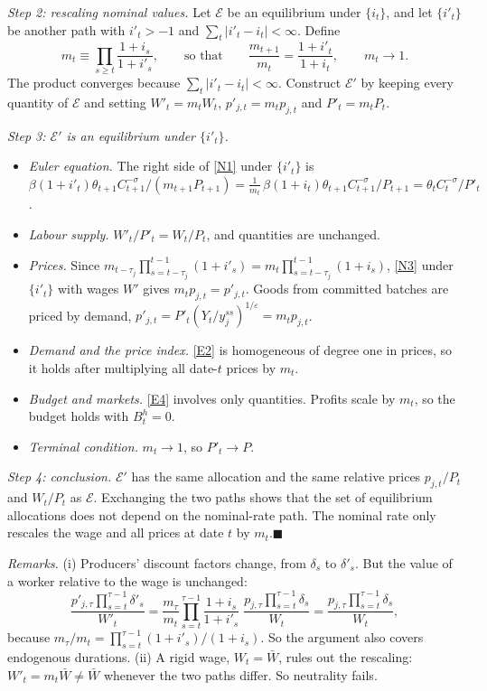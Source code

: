 \documentclass[11pt]{article}
\theoremstyle{definition}
\begin{document}
\emph{Step 2: rescaling nominal values.} Let $\mathcal E$ be an equilibrium under $\{i_t\}$, and let
$\{i'_t\}$ be another path with $i'_t>-1$ and $\sum_t|i'_t-i_t|<\infty$. Define
\[
  m_t\equiv\prod_{s\ge t}\frac{1+i_s}{1+i'_s},\qquad\text{so that}\qquad
  \frac{m_{t+1}}{m_t}=\frac{1+i'_t}{1+i_t},\qquad m_t\to1 .
\]
The product converges because $\sum_t|i'_t-i_t|<\infty$. Construct $\mathcal E'$ by keeping every
quantity of $\mathcal E$ and setting $W'_t=m_tW_t$, $p'_{j,t}=m_tp_{j,t}$ and $P'_t=m_tP_t$.

\emph{Step 3: $\mathcal E'$ is an equilibrium under $\{i'_t\}$.}
\begin{itemize}
  \item \emph{Euler equation.} The right side of \eqref{N1} under $\{i'_t\}$ is
        $\beta(1+i'_t)\theta_{t+1}C_{t+1}^{-\sigma}/(m_{t+1}P_{t+1})
        =\frac{1}{m_t}\,\beta(1+i_t)\theta_{t+1}C_{t+1}^{-\sigma}/P_{t+1}
        =\theta_tC_t^{-\sigma}/P'_t$.
  \item \emph{Labour supply.} $W'_t/P'_t=W_t/P_t$, and quantities are unchanged.
  \item \emph{Prices.} Since
        $m_{t-\tau_j}\prod_{s=t-\tau_j}^{t-1}(1+i'_s)=m_t\prod_{s=t-\tau_j}^{t-1}(1+i_s)$, \eqref{N3} under
        $\{i'_t\}$ with wages $W'$ gives $m_tp_{j,t}=p'_{j,t}$. Goods from committed batches are priced
        by demand, $p'_{j,t}=P'_t(Y_t/y_j^{ss})^{1/\varepsilon}=m_tp_{j,t}$.
  \item \emph{Demand and the price index.} \eqref{E2} is homogeneous of degree one in prices, so it
        holds after multiplying all date-$t$ prices by $m_t$.
  \item \emph{Budget and markets.} \eqref{E4} involves only quantities. Profits scale by $m_t$, so the
        budget holds with $B^h_t=0$.
  \item \emph{Terminal condition.} $m_t\to1$, so $P'_t\to P$.
\end{itemize}

\emph{Step 4: conclusion.} $\mathcal E'$ has the same allocation and the same relative prices
$p_{j,t}/P_t$ and $W_t/P_t$ as $\mathcal E$. Exchanging the two paths shows that the set of equilibrium
allocations does not depend on the nominal-rate path. The nominal rate only rescales the wage and
all prices at date $t$ by $m_t$.\hfill$\blacksquare$

\medskip
\noindent\emph{Remarks.} (i) Producers' discount factors change, from $\delta_s$ to $\delta'_s$. But
the value of a worker relative to the wage is unchanged:
\[
  \frac{p'_{j,\tau}\prod_{s=t}^{\tau-1}\delta'_s}{W'_t}
  =\frac{m_\tau}{m_t}\prod_{s=t}^{\tau-1}\frac{1+i_s}{1+i'_s}\;\frac{p_{j,\tau}\prod_{s=t}^{\tau-1}\delta_s}{W_t}
  =\frac{p_{j,\tau}\prod_{s=t}^{\tau-1}\delta_s}{W_t},
\]
because $m_\tau/m_t=\prod_{s=t}^{\tau-1}(1+i'_s)/(1+i_s)$. So the argument also covers endogenous
durations. (ii) A rigid wage, $W_t=\bar W$, rules out the rescaling: $W'_t=m_t\bar W\neq\bar W$ whenever
the two paths differ. So neutrality fails.
\end{document}
